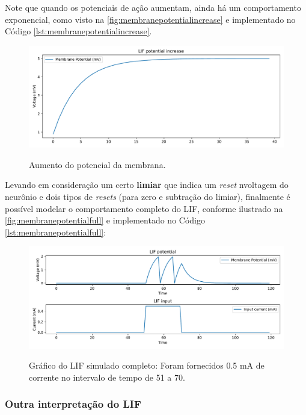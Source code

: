 			\par Note que quando os potenciais de ação aumentam, ainda há um comportamento exponencial, como visto na  \autoref{fig:membranepotentialincrease} e implementado no Código \autoref{lst:membranepotentialincrease}.
			
			
			
			\begin{figure}[H]
				\centering
				\caption{Aumento do potencial da membrana.}
				\includegraphics[width=.7\linewidth]{images/membranePotentialIncrease}
				\label{fig:membranepotentialincrease}
			\end{figure}
			
			\par Levando em consideração um certo \textbf{limiar} que indica um \textit{reset} nvoltagem do neurônio e dois tipos de \textit{resets} (para zero e subtração do limiar), finalmente é possível modelar o comportamento completo do LIF, conforme ilustrado na  \autoref{fig:membranepotentialfull} e implementado no Código \autoref{lst:membranepotentialfull}:
			
			
			
			\begin{figure}[H]
				\centering
				\caption[Gráfico do LIF]{Gráfico do LIF simulado completo: Foram fornecidos 0.5 mA de corrente no intervalo de tempo de 51 a 70.}
				\includegraphics[width=.8\linewidth]{images/membranePotentialFull}
				\label{fig:membranepotentialfull}
			\end{figure}

			
		\subsubsection{Outra interpretação do LIF}
			
